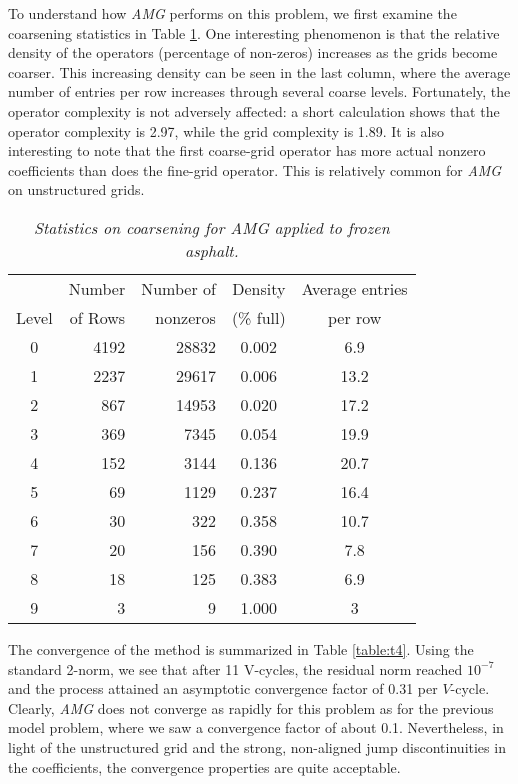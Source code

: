%
%
%
%
%
To understand how {\it AMG} performs on this problem, we first
examine the coarsening statistics in Table \ref{table:t3}. One
interesting phenomenon is that the relative density of the
operators (percentage of non-zeros) increases as the grids become
coarser. This increasing density can be seen in the last column,
where the average number of entries per row increases through
several coarse levels. Fortunately, the operator complexity is not
adversely affected: a short calculation shows that the operator
complexity is 2.97, while the grid complexity is 1.89. It is also
interesting to note that the first coarse-grid operator has more
actual nonzero coefficients than does the fine-grid operator. This
is relatively common for {\it AMG} on unstructured grids.

\medskip
\begin{table}
\begin{center}
\begin{tabular}{crrcc}\hline
       & Number  & Number of & Density  & Average entries \\
Level  & of Rows & nonzeros  & (\% full) & per row          \\
\hline
 0  &  4192  &  28832 & 0.002 & 6.9 \\
 1  &  2237  &  29617 & 0.006 & 13.2 \\
 2  &   867  &  14953 & 0.020 & 17.2 \\
 3  &   369  &   7345 & 0.054 & 19.9 \\
 4  &   152  &   3144 & 0.136 & 20.7 \\
 5  &    69  &   1129 & 0.237 & 16.4 \\
 6  &    30  &    322 & 0.358 & 10.7 \\
 7  &    20  &    156 & 0.390 &  7.8 \\
 8  &    18  &    125 & 0.383 &  6.9 \\
 9  &     3  &      9 & 1.000 &  3   \\\hline
\end{tabular}
\end{center}
\caption{\label{table:t3}{\em Statistics on coarsening for AMG
applied to frozen asphalt.}}
\end{table}

The convergence of the method is summarized in Table
\ref{table:t4}. Using the standard 2-norm, we see that after 11
V-cycles, the residual norm reached $10^{-7}$ and the process
attained an asymptotic convergence factor of 0.31 per $V$-cycle.
Clearly, {\it AMG} does not converge as rapidly for this problem
as for the previous model problem, where we saw a convergence
factor of about 0.1. Nevertheless, in light of the unstructured
grid and the strong, non-aligned jump discontinuities in the
coefficients, the convergence properties are quite acceptable.


